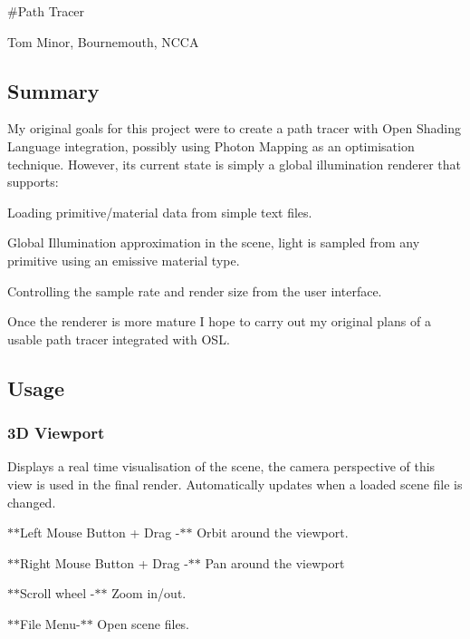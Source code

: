 \#\+Path Tracer

Tom Minor, Bournemouth, N\+C\+C\+A

\subsection*{Summary}

My original goals for this project were to create a path tracer with Open Shading Language integration, possibly using Photon Mapping as an optimisation technique. However, it\textquotesingle{}s current state is simply a global illumination renderer that supports\+:


\begin{DoxyItemize}
\item Loading primitive/material data from simple text files.
\item Global Illumination approximation in the scene, light is sampled from any primitive using an emissive material type.
\item Controlling the sample rate and render size from the user interface.
\end{DoxyItemize}

Once the renderer is more mature I hope to carry out my original plans of a usable path tracer integrated with O\+S\+L.



\subsection*{Usage}

\subsubsection*{3\+D Viewport}

Displays a real time visualisation of the scene, the camera perspective of this view is used in the final render. Automatically updates when a loaded scene file is changed.


\begin{DoxyItemize}
\item $\ast$$\ast$\+Left Mouse Button + Drag -\/$\ast$$\ast$ Orbit around the viewport.
\item $\ast$$\ast$\+Right Mouse Button + Drag -\/$\ast$$\ast$ Pan around the viewport
\item $\ast$$\ast$\+Scroll wheel -\/$\ast$$\ast$ Zoom in/out.
\item $\ast$$\ast$\+File Menu-\/$\ast$$\ast$ Open scene files.
\end{DoxyItemize}

